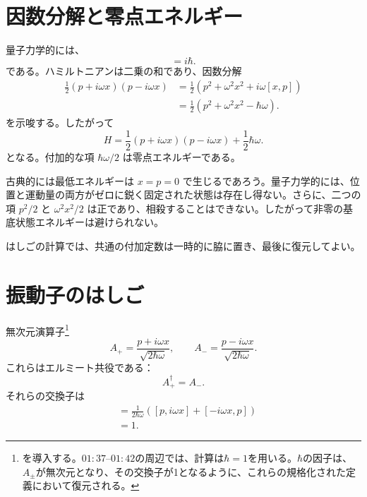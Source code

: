 \section{因数分解と零点エネルギー}

量子力学的には、
\begin{equation}
[x,p]=i\hbar.
\end{equation}
である。ハミルトニアンは二乗の和であり、因数分解
\begin{align}
\frac{1}{2}(p+i\omega x)(p-i\omega x)
&=\frac{1}{2}\left(p^2+\omega^2x^2+i\omega[x,p]\right) \\
&=\frac{1}{2}\left(p^2+\omega^2x^2-\hbar\omega\right).
\end{align}
を示唆する。したがって
\begin{equation}
H=\frac{1}{2}(p+i\omega x)(p-i\omega x)
+\frac{1}{2}\hbar\omega.
\end{equation}
となる。付加的な項 \(\hbar\omega/2\) は零点エネルギーである。

古典的には最低エネルギーは \(x=p=0\) で生じるであろう。量子力学的には、位置と運動量の両方がゼロに鋭く固定された状態は存在し得ない。さらに、二つの項 \(p^2/2\) と \(\omega^2x^2/2\) は正であり、相殺することはできない。したがって非零の基底状態エネルギーは避けられない。

はしごの計算では、共通の付加定数は一時的に脇に置き、最後に復元してよい。

\begin{classroomqa}
\end{classroomqa}

\section{振動子のはしご}

無次元演算子\footnote{を導入する。\(01{:}37\)--\(01{:}42\)の周辺では、計算は\(\hbar=1\)を用いる。\(\hbar\)の因子は、\(A_\pm\)が無次元となり、その交換子が1となるように、これらの規格化された定義において復元される。}
\begin{equation}
A_+=\frac{p+i\omega x}{\sqrt{2\hbar\omega}},
\qquad
A_-=\frac{p-i\omega x}{\sqrt{2\hbar\omega}}.
\end{equation}
これらはエルミート共役である：
\begin{equation}
A_+^\dagger=A_-.
\end{equation}
それらの交換子は
\begin{align}
[A_-,A_+]
&=\frac{1}{2\hbar\omega}
\left([p,i\omega x]+[-i\omega x,p]\right) \\
&=1.
\end{align}

